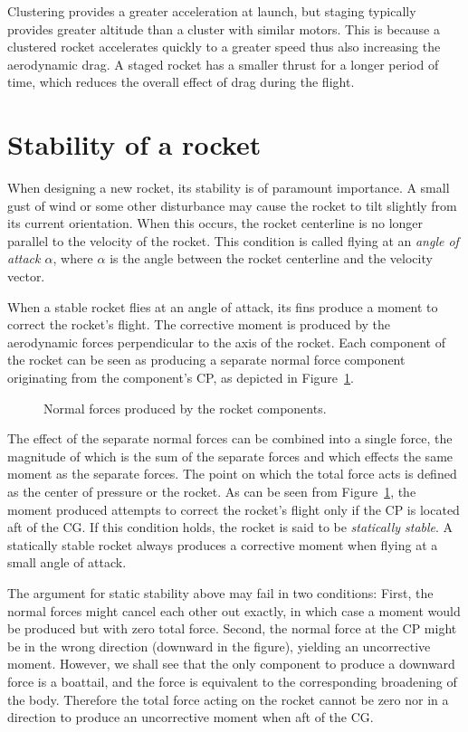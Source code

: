 Clustering provides a greater acceleration at launch, but staging
typically provides greater altitude than a cluster with similar
motors.  This is because a clustered rocket accelerates quickly to a
greater speed thus also increasing the aerodynamic drag.  A staged
rocket has a smaller thrust for a longer period of time, which reduces
the overall effect of drag during the flight.


\section{Stability of a rocket}
\label{sec-stability}

When designing a new rocket, its stability is of paramount
importance.  A small gust of wind or some other disturbance may cause
the rocket to tilt slightly from its current orientation.  When this
occurs, the rocket centerline is no longer parallel to the
velocity of the rocket.  This condition is called flying at an 
{\it angle of attack $\alpha$}, where $\alpha$ is the angle between
the rocket centerline and the velocity vector.

When a stable rocket flies at an angle of attack, its fins produce a
moment to correct the rocket's flight.  The corrective moment is
produced by the aerodynamic forces perpendicular to the axis of the
rocket.  Each component of the rocket can be seen as producing a
separate normal force component originating from the component's CP,
as depicted in Figure~\ref{fig-normal-forces}.

\begin{figure}
\centering
{}
\caption{Normal forces produced by the rocket components.}
\label{fig-normal-forces}
\end{figure}

The effect of the separate normal forces can be combined into a single
force, the magnitude of which is the sum of the separate forces and
which effects the same moment as the separate forces.  The point on
which the total force acts is defined as the center of pressure or the
rocket.  As
can be seen from Figure~\ref{fig-normal-forces}, the moment produced
attempts to correct the rocket's flight only if the CP is located aft
of the CG. If this condition holds, the rocket is said to be 
{\it statically stable}.  A statically stable rocket always produces a
corrective moment when flying at a small angle of attack.  

The argument for static stability above may fail in two conditions:
First, the normal forces might cancel each other out exactly, in which
case a moment would be produced but with zero total force.  Second,
the normal force at the CP might be in the wrong direction (downward
in the figure), yielding an uncorrective moment.  However, we shall
see that the only component to produce a downward force is a boattail,
and the force is equivalent to the corresponding broadening of the
body.  Therefore the total force acting on the rocket cannot be zero
nor in a direction to produce an uncorrective moment when aft of the
CG.

